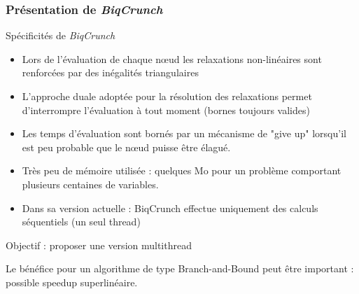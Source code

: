 \documentclass{beamer}
\def\bleu#1{{\color{blue}#1}}
\newcommand{\biqcrunch}{\emph{\mbox{BiqCrunch}}}
\begin{document}
\begin{frame}
\frametitle{Présentation de \biqcrunch}

\begin{block}{Spécificités de \biqcrunch}
\begin{itemize}
\item Lors de l'évaluation de chaque n\oe ud les relaxations non-linéaires sont renforcées par des inégalités triangulaires
\item L'approche duale adoptée pour la résolution des relaxations permet d'interrompre l'évaluation à tout moment (bornes toujours valides)
\item Les temps d'évaluation sont bornés par un mécanisme de "give up" lorsqu'il est peu probable que le n\oe ud puisse être élagué.
\item \bleu{Très peu de mémoire} utilisée : quelques Mo pour un problème comportant plusieurs centaines de variables.
\item Dans sa version actuelle : BiqCrunch effectue \bleu{uniquement des calculs séquentiels (un seul thread)}
\end{itemize}
\end{block}

\begin{block}{\alert{Objectif :} proposer une version multithread}

Le bénéfice pour un algorithme de type Branch-and-Bound peut être important : possible speedup superlinéaire.
\end{block}

\end{frame}
\end{document}

